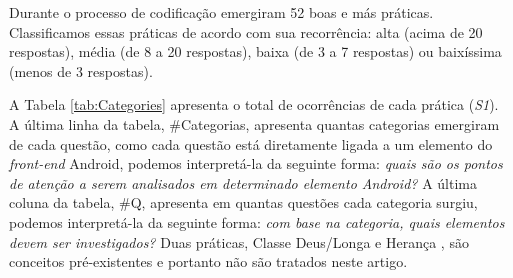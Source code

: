 Durante o processo de codificação emergiram 52 boas e más práticas. Classificamos essas práticas de acordo com sua recorrência: alta (acima de 20 respostas), média (de 8 a 20 respostas), baixa (de 3 a 7 respostas) ou baixíssima (menos de 3 respostas). 


A Tabela \ref{tab:Categories} apresenta o total de ocorrências de cada prática (\textit{S1}). A última linha da tabela, \#Categorias, apresenta quantas categorias emergiram de cada questão, como cada questão está diretamente ligada a um elemento do \textit{front-end} Android, podemos interpretá-la da seguinte forma: \emph{quais são os pontos de atenção a serem analisados em determinado elemento Android?} A última coluna da tabela, \#Q, apresenta em quantas questões cada categoria surgiu, podemos interpretá-la da seguinte forma: \emph{com base na categoria, quais elementos devem ser investigados?} Duas práticas, Classe Deus/Longa \cite{Riel, RefactoringFowler1999} e Herança \cite{WikipediaInhiritance}, são conceitos pré-existentes e portanto não são tratados neste artigo. 




